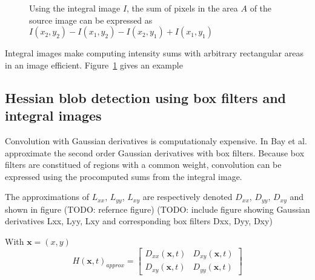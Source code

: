 \begin{figure}
    \centering
    \caption{
        Using the integral image $I$, the sum of pixels in the area $A$ of the source image can be expressed as
        $I(x_2,y_2) -  I(x_1,y_2) - I(x_2,y_1) + I(x_1,y_1)$
        \label{fig:integral_images}
    }
\end{figure}

Integral images make computing intensity sums with arbitrary rectangular areas in an image efficient. Figure~\ref{fig:integral_images} gives an example

\subsection{Hessian blob detection using box filters and integral images}

Convolution with Gaussian derivatives is computationaly expensive. In \cite{Bay06surf:speeded} Bay et al. approximate the second order Gaussian derivatives with box filters. Because box filters are constitued of regions with a common weight, convolution can be expressed using the procomputed sums from the integral image.

The approximations of $L_{xx}$, $L_{yy}$, $L_{xy}$ are respectively denoted $D_{xx}$, $D_{yy}$, $D_{xy}$ and shown in figure (TODO: refernce figure) (TODO: include figure showing Gaussian derivatives Lxx, Lyy, Lxy and corresponding box filters Dxx, Dyy, Dxy)

With $\mathbf{x} = (x,y)$
\begin{displaymath}
    H(\mathbf{x},t)_{approx} = 
    \begin{bmatrix}
        D_{xx}(\mathbf{x},t) & D_{xy}(\mathbf{x},t) \\
        D_{xy}(\mathbf{x},t) & D_{yy}(\mathbf{x},t)
    \end{bmatrix}
\end{displaymath}

